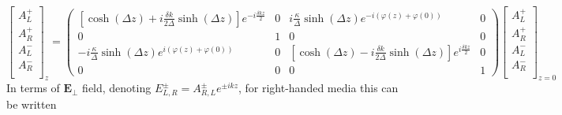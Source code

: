 \begin{equation}
\begin{bmatrix}
A_L^+ \\
A_R^+ \\
A_L^- \\
A_R^- \\
\end{bmatrix}_{z} = \begin{pmatrix}
\left[\cosh(\Delta z) + i \frac{\delta k}{2\Delta}\sinh(\Delta z)\right] e^{-i\frac{\delta kz}{2} } & 0 & i\frac{\kappa}{\Delta}\sinh(\Delta z) e^{-i(\varphi(z)+\varphi(0))} & 0 \\
0 & 1 & 0 & 0 \\
-i \frac{\kappa}{\Delta}\sinh(\Delta z)e^{i(\varphi(z)+\varphi(0))} & 0 & \left[\cosh(\Delta z) - i \frac{\delta k 	}{2\Delta}\sinh(\Delta z)\right]e^{i\frac{\delta kz}{2} } & 0 \\
0 & 0 & 0 & 1
\end{pmatrix}\begin{bmatrix}
A_L^+ \\
A_R^+ \\
A_L^- \\
A_R^- \\
\end{bmatrix}_{z=0}	\label{eq:sol_cwt_lh}
\end{equation}
%
In terms of $\bm{E}_\perp$ field, denoting $E_{L,R}^\pm=A_{R,L}^\pm e^{\pm ikz}$, for right-handed media this can be written

